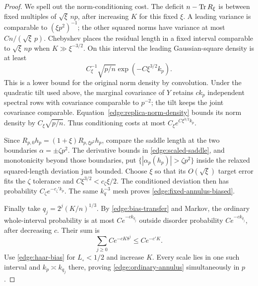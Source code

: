 \begin{proof}
We spell out the norm-conditioning cost.  The deficit
\(n-\operatorname{Tr} R_\xi\) is between fixed multiples of \(\sqrt\xi\,np\),
after increasing \(K\) for this fixed \(\xi\).  A leading variance is
comparable to \((\xi p^2)^{-1}\); the other squared norms have variance
at most \(Cn/(\sqrt\xi\,p)\).  Chebyshev places the residual length
in a fixed interval comparable to \(\sqrt\xi\,np\) when
\(K\gg\xi^{-3/2}\).  On this interval the leading Gaussian-square
density is at least
\[
 C_\xi^{-1}\sqrt{p/n}\exp(-C\xi^{3/2}k_p).
\]
This is a lower bound for the original norm density by convolution.
Under the quadratic tilt used above, the marginal covariance of \(Y\)
retains \(ck_p\) independent spectral rows with covariance comparable
to \(p^{-2}\); the tilt keeps the joint covariance comparable.
Equation~\eqref{edge:replica-norm-density} bounds its norm density by
\(C_\xi\sqrt{p/n}\).  Thus conditioning costs at most
\(C_\xi e^{C\xi^{3/2}k_p}\).

Since \(R_{p,0}h_p=(1+\xi)R_{p,\xi p^2}h_p\), compare the saddle
length at the two boundaries \(\alpha=\pm\zeta p^2\).  The derivative
bounds in \eqref{edge:scaled-saddle}, and monotonicity beyond those
boundaries, put
\(\{|\alpha_p(h_p)|>\zeta p^2\}\) inside the relaxed squared-length
deviation just bounded.  Choose \(\xi\) so that its \(O(\sqrt\xi)\)
target error fits the \(\zeta\) tolerance and
\(C\xi^{3/2}<c_\zeta\xi/2\).  The conditioned deviation then has
probability \(C_\zeta e^{-c_\zeta'k_p}\).
The same \(k_q^{-3}\) mesh proves \eqref{edge:fixed-annulus-biased}.

Finally take \(q_j=2^j(K/n)^{1/3}\).  By
\eqref{edge:bias-transfer} and Markov, the ordinary whole-interval
probability is at most \(Ce^{-c k_{q_j}}\) outside disorder probability
\(Ce^{-c k_{q_j}}\), after decreasing \(c\).  Their sum is
\[
 \sum_{j\ge0}Ce^{-cK8^j}\le Ce^{-c'K}.
\]
Use \eqref{edge:haar-bias} for \(L_\circ<1/2\) and increase \(K\).
Every scale lies in one such interval and \(k_p\asymp k_{q_j}\)
there, proving \eqref{edge:ordinary-annulus} simultaneously in \(p\).
\end{proof}

